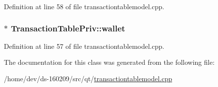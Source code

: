 Definition at line 58 of file transactiontablemodel.\+cpp.

\hypertarget{class_transaction_table_priv_a01cb7d238e5dea44b9f7f1ee75d5849d}{}
\subsubsection[{wallet}]{$\ast$ Transaction\+Table\+Priv\+::wallet}\label{class_transaction_table_priv_a01cb7d238e5dea44b9f7f1ee75d5849d}


Definition at line 57 of file transactiontablemodel.\+cpp.



The documentation for this class was generated from the following file\+:\begin{DoxyCompactItemize}
\item 
/home/dev/ds-\/160209/src/qt/\hyperlink{transactiontablemodel_8cpp}{transactiontablemodel.\+cpp}\end{DoxyCompactItemize}
